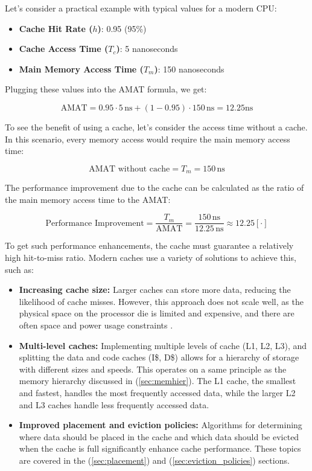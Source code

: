 \noindent Let's consider a practical example with typical values for a modern CPU:

\begin{itemize}
    \item \textbf{Cache Hit Rate ($h$)}: 0.95 (95\%) \cite{comparchaquant}
    \item \textbf{Cache Access Time ($T_c$)}: 5 nanoseconds \cite{Patterson2013}
    \item \textbf{Main Memory Access Time ($T_m$)}: 150 nanoseconds \cite{Hamacher2011}
\end{itemize}

\noindent Plugging these values into the AMAT formula, we get:

\[
\text{AMAT} = 0.95 \cdot 5 \, \text{ns} + (1 - 0.95) \cdot 150 \, \text{ns} = 12.25 \text{ns} %
\]

\noindent To see the benefit of using a cache, let's consider the access time without a cache. In this scenario, every memory access would require the main memory access time:

\[
\text{AMAT without cache} = T_m = 150 \, \text{ns}
\]

\noindent The performance improvement due to the cache can be calculated as the ratio of the main memory access time to the AMAT:

\[
\text{Performance Improvement} = \frac{T_m}{\text{AMAT}} = \frac{150 \, \text{ns}}{12.25 \, \text{ns}} \approx 12.25 [\cdot]
\]

\vspace{10px} \noindent To get such performance enhancements, the cache must guarantee a relatively high hit-to-miss ratio. Modern caches use a variety of solutions to achieve this, such as:

\begin{itemize}
	\item \textbf{Increasing cache size:} Larger caches can store more data, reducing the likelihood of cache misses. However, this approach does not scale well,
		as the physical space on the processor die is limited and expensive, and there are often space and power usage constraints \cite{Smith1982} \cite{Hill1989}.
	\item \textbf{Multi-level caches:} Implementing multiple levels of cache (L1, L2, L3), and splitting the data and code caches (I\$, D\$) allows for a hierarchy of storage with different
		sizes and speeds. This operates on a same principle as the memory hierarchy discussed in (\ref{sec:memhier}). The L1 cache, the smallest and fastest, handles the most frequently accessed data,
		while the larger L2 and L3 caches handle less frequently accessed data.
	\item \textbf{Improved placement and eviction policies:} Algorithms for determining where data should be placed in the cache and which data should be evicted when the cache is full
		significantly enhance cache performance. These topics are covered in the (\ref{sec:placement}) and (\ref{sec:eviction_policies}) sections.
\end{itemize}

